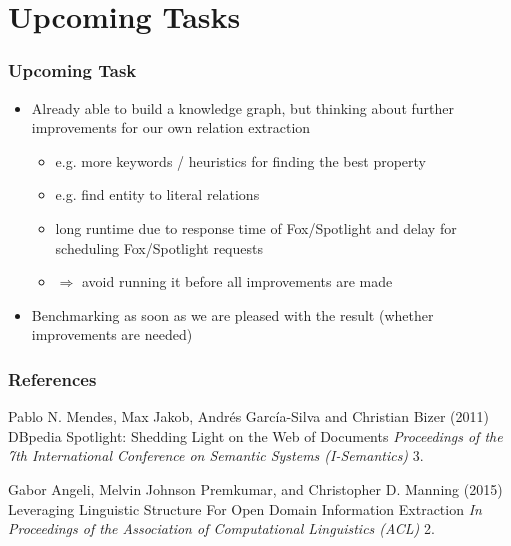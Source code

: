 \documentclass{beamer}
\begin{document}

\section{Upcoming Tasks}

\begin{frame}
\frametitle{Upcoming Task}
\begin{itemize}
	\item Already able to build a knowledge graph, but thinking about further improvements for our own relation extraction
	\begin{itemize}
		\item e.g. more keywords / heuristics for finding the best property
		\item e.g. find entity to literal relations 
		\item long runtime due to response time of Fox/Spotlight and delay for scheduling Fox/Spotlight requests
		\item[] $\Rightarrow$ avoid running it before all improvements are made
	\end{itemize}
	\item Benchmarking as soon as we are pleased with the result (whether improvements are needed)
\end{itemize}
\end{frame}


\begin{frame}
\frametitle{References}
\footnotesize{
	\begin{thebibliography}{99} %
		 Pablo N. Mendes, Max Jakob, Andrés García-Silva and Christian Bizer (2011)
		\newblock DBpedia Spotlight: Shedding Light on the Web of
		Documents
		\newblock \emph{
			Proceedings of the 7th International Conference on Semantic Systems (I-Semantics) } 3.
	\end{thebibliography}
	\begin{thebibliography}{99} %
		 Gabor Angeli, Melvin Johnson Premkumar, and Christopher D. Manning (2015)
		\newblock Leveraging Linguistic Structure For Open Domain Information
		Extraction
		\newblock \emph{
			In Proceedings of the Association of Computational Linguistics (ACL) } 2.
	\end{thebibliography}
}
\end{frame}
\end{document}
